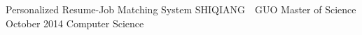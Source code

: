 \maketitlepage
{Personalized Resume-Job Matching System
}   %
{SHIQIANG~~GUO}%
{Master of Science}                %
{October 2014}%
{Computer Science}         %
